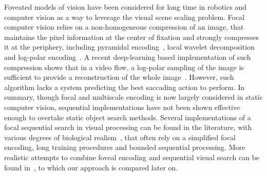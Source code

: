 Foveated models of vision have been considered for long time in robotics and computer vision as a way to leverage the visual scene scaling problem. Focal computer vision relies on a non-homogeneous compression of an image, that maintains the pixel information at the center of fixation and strongly compresses it at the periphery, including pyramidal encoding~\cite{kortum1996implementation,Butko2010infomax}, local wavelet decomposition~\cite{dauce2018active} and log-polar encoding~\cite{fischer2007self,Traver10}.
A recent deep-learning based implementation of such compression shows that in a video flow, a log-polar sampling of the image is sufficient to provide a reconstruction of the whole image~\cite{Kaplanyan19}. However, such algorithm lacks a system predicting the best saccading action to perform. In summary, though focal and multiscale encoding is now largely considered in static computer vision, sequential implementations have not been shown effective enough to overtake static object search methods.
Several implementations of a focal sequential search in visual processing can be found in the literature, with various degrees of biological realism~\cite{mnih2014recurrent,fu2017look}, that often rely on a simplified focal encoding, long training procedures and bounded sequential processing. More realistic attempts to combine foveal encoding and sequential visual search can be found in~\cite{Butko2010infomax,denil2012learning,dauce2018active}, {\color{magenta} to which our approach is compared later on}.

